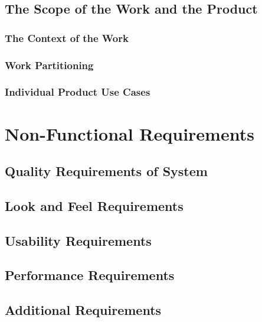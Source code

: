 \documentclass{article}
\begin{document}
\subsection{The Scope of the Work and the Product}

\subsubsection{The Context of the Work}

\subsubsection{Work Partitioning}

\subsubsection{Individual Product Use Cases}

\subsection{}

\section{Non-Functional Requirements}

\subsection{Quality Requirements of System}

\subsection{Look and Feel Requirements}

\subsection{Usability Requirements}

\subsection{Performance Requirements}

\subsection{Additional Requirements}
\end{document}
